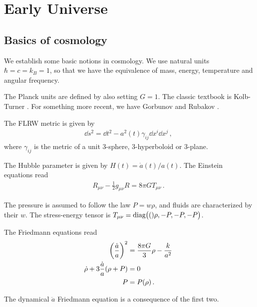 \documentclass[main.tex]{subfiles}
\begin{document}
\chapter{Early Universe}

\section{Basics of cosmology}


We establish some basic notions in cosmology. We use natural units \(\hbar = c = k_B = 1\), so that we have the equivalence of mass, energy, temperature and angular frequency. 

The Planck units are defined by also setting \(G =1\).
The classic textbook is Kolb-Turner \cite[]{kolbEarlyUniverse1994}.
For something more recent, we have Gorbunov and Rubakov \cite[]{gorbunovIntroductionTheoryEarly2011}.

The FLRW metric is given by 
%
\begin{align}
\dd{s^2} = \dd{t}^2  - a^2(t) \gamma_{ij} \dd{x^{i}} \dd{x^{j}}
\,,
\end{align}
%
where \(\gamma_{ij}\) is the metric of a unit 3-sphere, 3-hyperboloid or 3-plane.

The Hubble parameter is given by \(H(t) = \dot{a}(t) / a(t)\). The Einstein equations read 
%
\begin{align}
R_{\mu \nu } - \frac{1}{2} g_{\mu \nu } R= 8 \pi G T_{\mu \nu }
\,.
\end{align}

The pressure is assumed to follow the law \(P = w \rho \), and fluids are characterized by their \(w\). 
The stress-energy tensor is \(T_{\mu \nu } = \text{diag}\qty(()\rho , - P, -P, -P)\).

The Friedmann equations read 
%
\begin{subequations}
\begin{align}
\qty( \frac{\dot{a}}{a})^2 &= \frac{8 \pi G}{3} \rho - \frac{k}{a^2}  \\
\dot{\rho} + 3 \frac{\dot{a}}{a}(\rho + P) &=0  \\
P &= P(\rho ) 
\,.
\end{align}
\end{subequations}

The dynamical \(\ddot{a}\) Friedmann equation is a consequence of the first two. 
\end{document}
